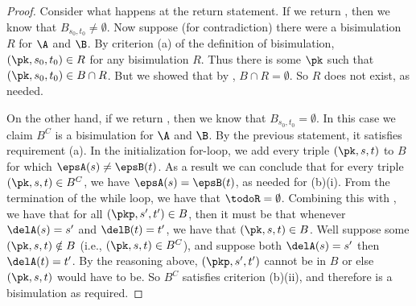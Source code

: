 \begin{proof}
Consider what happens at the return statement. If we return \false, then
we know that $B_{s_0,t_0} \neq \emptyset$. Now suppose (for contradiction) there were
a bisimulation $R$ for $\A$ and $\B$. By criterion (a) of the
definition of bisimulation, $(\pk, s_0, t_0)\in R$ for any bisimulation $R$.
Thus there is some $\pk$ such that $(\pk, s_0, t_0)\in B\cap R$. But we showed
that by , $B\cap R = \emptyset$. So $R$ does not exist, as needed.

On the other hand, if we return \true, then we
know that $B_{s_0,t_0} = \emptyset$. In this case we claim $B^C$ is a
bisimulation for $\A$ and $\B$. By the previous statement, it satisfies
requirement (a). In the initialization for-loop, we add every triple $(\pk,
s,t)$ to $B$ for which $\epsA(s) \neq \epsB(t)$. As a result we can conclude
that for every triple $(\pk, s, t)\in B^C$, we have $\epsA(s) = \epsB(t)$, as
needed for (b)(i). From the termination of the while loop, we have that $\todoR
= \emptyset$. Combining this with , we have that for all $(\pkp, s',
t')\in B$, then it must be that whenever $\delA(s) = s'$ and $\delB(t) = t'$, we
have that $(\pk, s, t) \in B$. Well suppose some $(\pk, s, t)\notin B$ (i.e.,
$(\pk, s, t)\in B^C$), and suppose both $\delA(s) = s'$ then  $\delA(t) = t'$.
By the reasoning above, $(\pkp, s', t')$ cannot be in $B$ or else $(\pk, s, t)$
would have to be. So $B^C$ satisfies criterion (b)(ii), and therefore is a
bisimulation as required.
\end{proof}